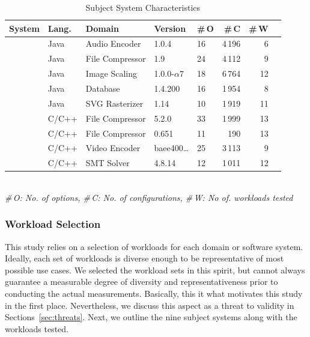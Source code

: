 {{\begin{table}
	\footnotesize
	\centering
	\caption{Subject System Characteristics}
	

\begin{tabular}{p{1.1cm}p{0.6cm}p{1.9cm}p{0.99cm}p{0.2cm}rrr}
	\toprule
	\textbf{System} & \textbf{Lang.} & \textbf{Domain} & \textbf{Version} & \textbf{\#\,O} & \textbf{\#\,C} & \textbf{\#\,W}  \\
	
	
	\midrule
	\jumper & Java & Audio Encoder & 1.0.4 & 16 & 4\,196 & 6   \\
	
	\kanzi &Java  & File Compressor & 1.9 & 24 & 4\,112 & 9 \\
	
	\dconvert & Java & Image Scaling & 1.0.0-$\alpha$7 & 18 & 6\,764 & 12  \\
	
	\htwo & Java & Database & 1.4.200 & 16 & 1\,954  & 8  \\
	
	\batik & Java & SVG Rasterizer & 1.14 & 10 & 1\,919 &  11  \\

	\midrule
	
	\xz & C/C++ & File Compressor & 5.2.0 & 33 & 1\,999 & 13  \\
	\lrzip & C/C++ & File Compressor & 0.651 & 11 & 190 & 13  \\
	
	\xzwo & C/C++ & Video Encoder & baee400\ldots & 25 & 3\,113 & 9  \\
	\zdrei & C/C++ & SMT Solver & 4.8.14 & 12 & 1\,011 & 12  \\
	
	\bottomrule
	
\end{tabular}\\
{\centering\vspace{1mm}\textit{\#\,O: No. of options, \#\,C: No. of configurations, \#\,W: No of. workloads tested}}
	

	\label{tab:subject_systems}
\end{table}

\subsubsection{Workload Selection}
This study relies on a selection of workloads for each domain or software system. Ideally, each set of workloads is diverse enough to be representative of most possible use cases. We selected the workload sets in this spirit, but cannot always guarantee a measurable degree of diversity and representativeness prior to conducting the actual measurements. Basically, this it what motivates this study in the first place. Nevertheless, we discuss this aspect as a threat to validity in Sections~\ref{sec:threats}. Next, we outline the nine subject systems along with the workloads tested. 

}}
